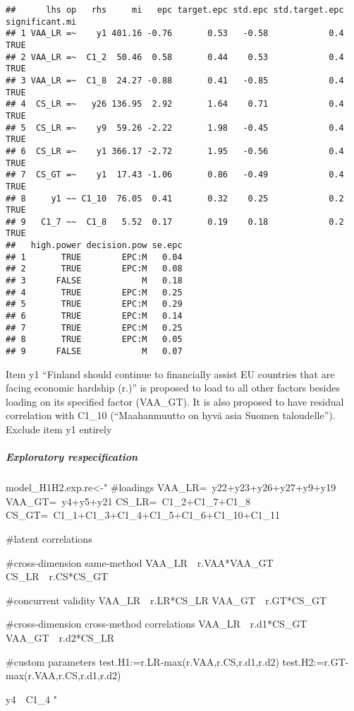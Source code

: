 \documentclass[
]{article}
\newenvironment{Shaded}{\begin{snugshade}}{\end{snugshade}}
\newcommand{\NormalTok}[1]{#1}
\newcommand{\StringTok}[1]{\textcolor[rgb]{0.31,0.60,0.02}{#1}}
\begin{document}
\begin{verbatim}
##      lhs op   rhs     mi   epc target.epc std.epc std.target.epc significant.mi
## 1 VAA_LR =~    y1 401.16 -0.76       0.53   -0.58            0.4           TRUE
## 2 VAA_LR =~  C1_2  50.46  0.58       0.44    0.53            0.4           TRUE
## 3 VAA_LR =~  C1_8  24.27 -0.88       0.41   -0.85            0.4           TRUE
## 4  CS_LR =~   y26 136.95  2.92       1.64    0.71            0.4           TRUE
## 5  CS_LR =~    y9  59.26 -2.22       1.98   -0.45            0.4           TRUE
## 6  CS_LR =~    y1 366.17 -2.72       1.95   -0.56            0.4           TRUE
## 7  CS_GT =~    y1  17.43 -1.06       0.86   -0.49            0.4           TRUE
## 8     y1 ~~ C1_10  76.05  0.41       0.32    0.25            0.2           TRUE
## 9   C1_7 ~~  C1_8   5.52  0.17       0.19    0.18            0.2           TRUE
##   high.power decision.pow se.epc
## 1       TRUE        EPC:M   0.04
## 2       TRUE        EPC:M   0.08
## 3      FALSE            M   0.18
## 4       TRUE        EPC:M   0.25
## 5       TRUE        EPC:M   0.29
## 6       TRUE        EPC:M   0.14
## 7       TRUE        EPC:M   0.25
## 8       TRUE        EPC:M   0.05
## 9      FALSE            M   0.07
\end{verbatim}

Item y1 ``Finland should continue to financially assist EU countries
that are facing economic hardship (r.)'' is proposed to load to all
other factors besides loading on its specified factor (VAA\_GT). It is
also proposed to have residual correlation with C1\_10 (``Maahanmuutto
on hyvä asia Suomen taloudelle''). Exclude item y1 entirely

\hypertarget{exploratory-respecification}{%
\subparagraph{Exploratory
respecification}\label{exploratory-respecification}}

\begin{Shaded}
\begin{Highlighting}[]
\NormalTok{model_H1H2.exp.re<-}\StringTok{"}
\StringTok{#loadings}
\StringTok{VAA_LR=~y22+y23+y26+y27+y9+y19}
\StringTok{VAA_GT=~y4+y5+y21}
\StringTok{CS_LR=~C1_2+C1_7+C1_8}
\StringTok{CS_GT=~C1_1+C1_3+C1_4+C1_5+C1_6+C1_10+C1_11}

\StringTok{#latent correlations}

\StringTok{#cross-dimension same-method}
\StringTok{VAA_LR~~r.VAA*VAA_GT}
\StringTok{CS_LR~~r.CS*CS_GT}

\StringTok{#concurrent validity}
\StringTok{VAA_LR~~r.LR*CS_LR}
\StringTok{VAA_GT~~r.GT*CS_GT}

\StringTok{#cross-dimension cross-method correlations}
\StringTok{VAA_LR~~r.d1*CS_GT}
\StringTok{VAA_GT~~r.d2*CS_LR}

\StringTok{#custom parameters}
\StringTok{test.H1:=r.LR-max(r.VAA,r.CS,r.d1,r.d2)}
\StringTok{test.H2:=r.GT-max(r.VAA,r.CS,r.d1,r.d2)}


\StringTok{y4~~C1_4}
\StringTok{"}
\end{Highlighting}
\end{Shaded}
\end{document}
